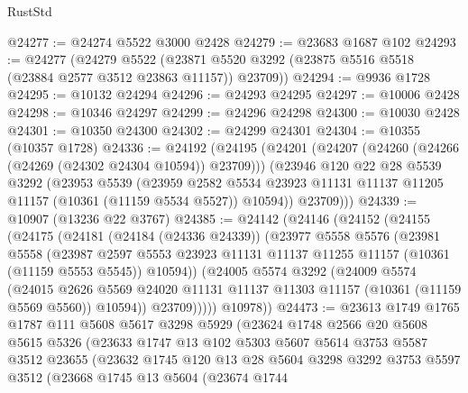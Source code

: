 \begin{lexlean}{RustStd}
\begin{coremodule}
@24277 := @24274 @5522 @3000 @2428
@24279 := @23683 @1687 @102
@24293 := @24277
    (@24279
      @5522
      (@23871 @5520 @3292 (@23875 @5516 @5518 (@23884 @2577 @3512 @23863 @11157)) @23709))
@24294 := @9936 @1728
@24295 := @10132 @24294
@24296 := @24293 @24295
@24297 := @10006 @2428
@24298 := @10346 @24297
@24299 := @24296 @24298
@24300 := @10030 @2428
@24301 := @10350 @24300
@24302 := @24299 @24301
@24304 := @10355 (@10357 @1728)
@24336 := @24192
    (@24195
      (@24201
        (@24207 (@24260 (@24266 (@24269 (@24302 @24304 @10594)) @23709)))
        (@23946
          @120
          @22
          @28
          @5539
          @3292
          (@23953
            @5539
            (@23959
              @2582
              @5534
              @23923
              @11131
              @11137
              @11205
              @11157
              (@10361 (@11159 @5534 @5527))
              @10594))
          @23709)))
@24339 := @10907 (@13236 @22 @3767)
@24385 := @24142
    (@24146
      (@24152
        (@24155
          (@24175
            (@24181
              (@24184 (@24336 @24339))
              (@23977
                @5558
                @5576
                (@23981
                  @5558
                  (@23987
                    @2597
                    @5553
                    @23923
                    @11131
                    @11137
                    @11255
                    @11157
                    (@10361 (@11159 @5553 @5545))
                    @10594))
                (@24005
                  @5574
                  @3292
                  (@24009
                    @5574
                    (@24015
                      @2626
                      @5569
                      @24020
                      @11131
                      @11137
                      @11303
                      @11157
                      (@10361 (@11159 @5569 @5560))
                      @10594))
                  @23709)))))
        @10978))
@24473 := @23613
    @1749
    @1765
    @1787
    @111
    @5608
    @5617
    @3298
    @5929
    (@23624
      @1748
      @2566
      @20
      @5608
      @5615
      @5326
      (@23633
        @1747
        @13
        @102
        @5303
        @5607
        @5614
        @3753
        @5587
        @3512
        @23655
        (@23632
          @1745
          @120
          @13
          @28
          @5604
          @3298
          @3292
          @3753
          @5597
          @3512
          (@23668
            @1745
            @13
            @5604
            (@23674
              @1744

\end{coremodule}
\end{lexlean}
